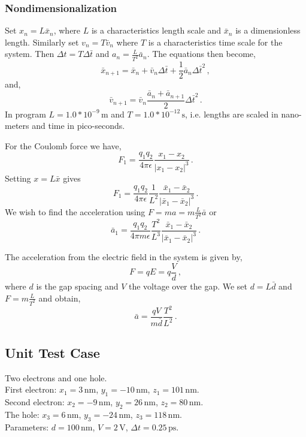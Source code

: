 \documentclass[a4paper,10pt]{article}
\numberwithin{equation}{section}
\begin{document}
\subsubsection{Nondimensionalization}
  Set \(x_n = L \bar{x}_n\), where \(L\) is a characteristics length scale and
  \(\bar{x}_n\) is a dimensionless length. Similarly set \(v_n = T \bar{v}_n\)
  where \(T\) is a characteristics time scale for the system.
  Then \(\Delta t = T\Delta \bar{t}\) and \(a_n = \frac{L}{T^2}\bar{a}_n\).
  The equations then become,
  \begin{equation}
    \bar{x}_{n+1} = \bar{x}_n + \bar{v}_n\Delta \bar{t} + \frac{1}{2}\bar{a}_n{\Delta \bar{t}}^2\, ,
  \end{equation}
  and,
  \begin{equation}
    \bar{v}_{n+1} = \bar{v}_n \frac{\bar{a}_n + \bar{a}_{n+1}}{2}{\Delta \bar{t}}^2\, .
  \end{equation}
  In program \(L = 1.0*10^{-9}\,\mathrm{m}\) and \(T = 1.0*10^{-12}\,\mathrm{s}\),
  i.e. lengths are scaled in nano-meters and time in pico-seconds.

  For the Coulomb force we have,
  \begin{equation}
    F_1 = \frac{q_1 q_2}{4\pi\epsilon} \frac{x_1 - x_2}{|x_1 - x_2|^3}\, .
  \end{equation}
  Setting \(x = L\bar{x}\) gives
  \begin{equation}
    F_1 = \frac{q_1 q_2}{4\pi\epsilon} \frac{1}{L^2} \frac{\bar{x}_1 - \bar{x}_2}{|\bar{x}_1 - \bar{x}_2|^3}\, .
  \end{equation}
  We wish to find the acceleration using \(F = ma = m\frac{L}{T^2}\bar{a}\) or
  \begin{equation}
    \bar{a}_1 = \frac{q_1 q_2}{4\pi m\epsilon} \frac{T^2}{L^3} \frac{\bar{x}_1 - \bar{x}_2}{|\bar{x}_1 - \bar{x}_2|^3}\, .
  \end{equation}

  The acceleration from the electric field in the system is given by,
  \begin{equation}
    F = qE = q\frac{V}{d}\, ,
  \end{equation}
  where \(d\) is the gap spacing and \(V\) the voltage over the gap.
  We set \(d = L\bar{d}\) and \(F = m\frac{L}{T^2}\) and obtain,
  \begin{equation}
    \bar{a} = \frac{qV}{m\bar{d}} \frac{T^2}{L^2}\, .
  \end{equation}

  \subsection{Unit Test Case}
  Two electrons and one hole.\\
  First electron: \(x_1 = 3\,\mathrm{nm}\), \(y_1 = -10\,\mathrm{nm}\), \(z_1 = 101\,\mathrm{nm}\).\\
  Second electron: \(x_2 = -9\,\mathrm{nm}\), \(y_2 = 26\,\mathrm{nm}\), \(z_2 = 80\,\mathrm{nm}\).\\
  The hole: \(x_3 = 6\,\mathrm{nm}\), \(y_3 = -24\,\mathrm{nm}\), \(z_3 = 118\,\mathrm{nm}\).\\
  Parameters: \(d = 100\,\mathrm{nm}\), \(V = 2\,\mathrm{V}\), \(\Delta t = 0.25\,\mathrm{ps}\).
\end{document}
